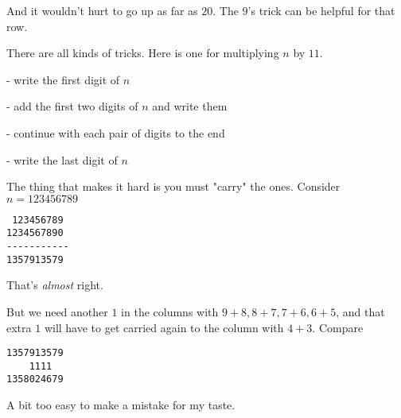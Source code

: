 \documentclass[11pt, oneside]{article}
\begin{document}
And it wouldn't hurt to go up as far as $20$.  The $9$'s trick can be helpful for that row.

There are all kinds of tricks.  Here is one for multiplying $n$ by $11$.  

- write the first digit of $n$

- add the first two digits of $n$ and write them

- continue with each pair of digits to the end

- write the last digit of $n$

The thing that makes it hard is you must "carry" the ones.  Consider $n=123456789$

\begin{verbatim}
 123456789
1234567890
-----------
1357913579
\end{verbatim}

That's \emph{almost} right.

But we need another $1$ in the columns with $9+8, 8+7, 7+6, 6+5$, and that extra $1$ will have to get carried again to the column with $4+3$.  Compare

\begin{verbatim}
1357913579
    1111
1358024679
\end{verbatim}

A bit too easy to make a mistake for my taste.
\end{document}
